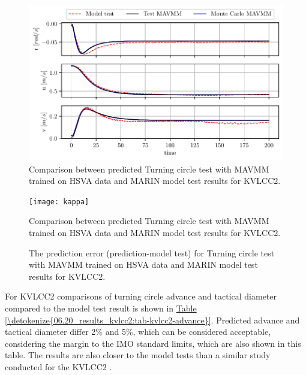 \begin{figure}[!htb]
\centering
\includegraphics{kappa/images/16.pdf}
\caption{Comparison between predicted Turning circle test with MAVMM trained on HSVA data and MARIN model test results for KVLCC2.}\label{\detokenize{06.20_results_kvlcc2:fig-kvlcc2-track-plot-testing-sim}}\end{figure}

\begin{figure}[!htb]
\centering
\texttt{[image: kappa]}
\caption{Comparison between predicted Turning circle test with MAVMM trained on HSVA data and MARIN model test results for KVLCC2.}\label{\detokenize{06.20_results_kvlcc2:fig-kvlcc2-testing-sim}}\end{figure}

\begin{figure}[!htb]
\centering
\capstart

\noindent{}
\caption{The prediction error (prediction-model test) for Turning circle test with MAVMM trained on HSVA data and MARIN model test results for KVLCC2.}\label{\detokenize{06.20_results_kvlcc2:fig-kvlcc2-testing-sim-error}}\end{figure}

\sphinxAtStartPar
For KVLCC2 comparisons of turning circle advance and tactical diameter compared to the model test result is shown in \hyperref[\detokenize{06.20_results_kvlcc2:tab-kvlcc2-advance}]{Table \ref{\detokenize{06.20_results_kvlcc2:tab-kvlcc2-advance}}}. Predicted advance and tactical diameter differ 2\% and 5\%, which can be considered acceptable, considering the margin to the IMO standard limits, which are also shown in this table. The results are also closer to the model tests than a similar study conducted for the KVLCC2 \cite{he_nonparametric_2022}.


